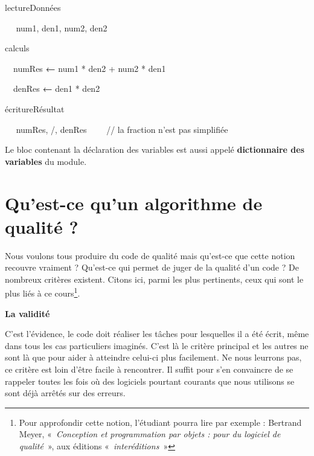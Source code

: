 {\sffamily

{\sffamily
{}}


\bigskip

{\sffamily
{} lectureDonnées}

{\sffamily
\ \  num1, den1, num2, den2}

{\sffamily
{}}


\bigskip


\bigskip


\bigskip

{\sffamily
{} calculs}

{\sffamily
{\ \ numRes
}{\textbf{←}}{ num1 *
den2 + num2 * den1}}

{\sffamily
{\ \ denRes
}{\textbf{←}}{ den1 *
den2}}

{\sffamily
{}}


\bigskip

{\sffamily
{} écritureRésultat}

{\sffamily
\ \  numRes, {\textquotedbl}/{\textquotedbl},
denRes \ \ \ \ // la fraction n'est pas simplifiée}

{\sffamily
{}}

{
{Le bloc contenant la déclaration des variables
est aussi appelé }{\textbf{dictionnaire des
variables}}{ du module.}}

\section{Qu'est-ce qu'un algorithme de
qualité ?}
{
Nous voulons tous produire du code de qualité mais
qu'est-ce que cette notion recouvre vraiment ?
Qu'est-ce qui permet de juger de la qualité
d'un code ? De nombreux critères existent. Citons ici,
parmi les plus pertinents, ceux qui sont le plus liés à ce
cours\footnote{Pour approfondir cette notion,
l'étudiant pourra lire par exemple : Bertrand Meyer,
«~\textit{Conception et programmation par objets : pour du logiciel de
qualité}~», aux éditions «\textit{~interéditions~}»}. }

{\sffamily\bfseries\upshape
La validité}

{
C'est l'évidence, le code doit
réaliser les tâches pour lesquelles il a été écrit, même dans tous les
cas particuliers imaginés. C'est là le critère
principal et les autres ne sont là que pour aider à atteindre celui-ci
plus facilement. Ne nous leurrons pas, ce critère est loin
d'être facile à rencontrer. Il suffit pour
s'en convaincre de se rappeler toutes les fois où des
logiciels pourtant courants que nous utilisons se sont déjà arrêtés sur
des erreurs.}

}
